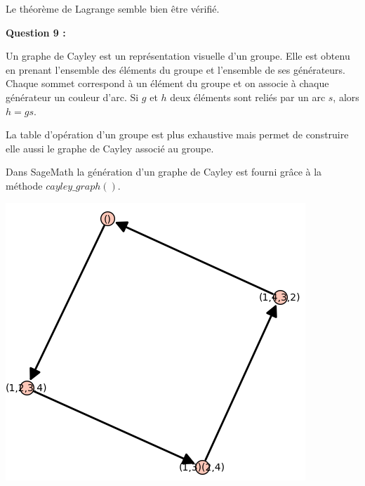 \documentclass[titlepage]{article}
\begin{document}
    Le théorème de Lagrange semble bien être vérifié.
    \newline

    \textbf{Question 9 :}

    Un graphe de Cayley est un représentation visuelle d'un groupe. Elle est obtenu en prenant l'ensemble des éléments du groupe et l'ensemble de ses générateurs.
    Chaque sommet correspond à un élément du groupe et on associe à chaque générateur un couleur d'arc. Si $g$ et $h$ deux éléments sont reliés par un arc $s$, alors $h = gs$.

    La table d'opération d'un groupe est plus exhaustive mais permet de construire elle aussi le graphe de Cayley associé au groupe.

    Dans SageMath la génération d'un graphe de Cayley est fourni grâce à la méthode $cayley\_graph()$.

    \begin{center}
        \includegraphics[scale=0.5]{q91.png}
    \end{center}
\end{document}

